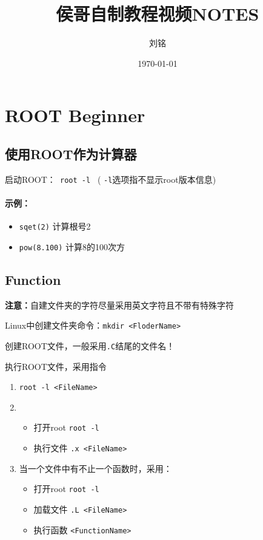 \documentclass{article}
\title{侯哥自制教程视频NOTES}
\author{刘铭}
\date{\today}
\begin{document}
\maketitle
\tableofcontents

\section{ROOT Beginner}
\subsection{使用ROOT作为计算器}
启动ROOT：\texttt{ root -l } ( \texttt{-l}选项指不显示root版本信息)

\paragraph{示例：}
\begin{itemize}
    \item \texttt{sqet(2)}      计算根号2
    \item \texttt{pow(8.100)}   计算8的100次方
\end{itemize}

\subsection{Function}
\textbf{注意：}自建文件夹的字符尽量采用英文字符且不带有特殊字符


Linux中创建文件夹命令：\texttt{mkdir <FloderName>}

创建ROOT文件，一般采用\texttt{.C}结尾的文件名！

执行ROOT文件，采用指令
\begin{enumerate}
    \item \texttt{root -l <FileName>}
    \item \begin{itemize}
              \item 打开root \texttt{root -l}
              \item 执行文件 \texttt{.x <FileName>}
          \end{itemize}
    \item 当一个文件中有不止一个函数时，采用：
          \begin{itemize}
              \item 打开root \texttt{root -l}
              \item 加载文件 \texttt{.L <FileName>}
              \item 执行函数 \texttt{<FunctionName>}
          \end{itemize}
\end{enumerate}
\end{document}
